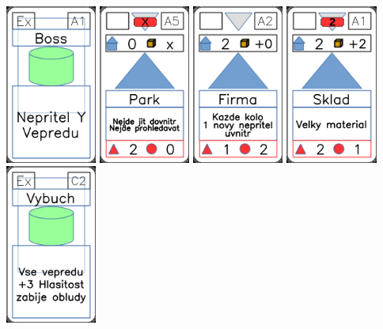 \documentclass[a4paper]{article}
\begin{document}
	\includegraphics[width=3.0cm]{img-4_0}
	\includegraphics[width=3.0cm]{img-3_19}
	\includegraphics[width=3.0cm]{img-3_16}
	\includegraphics[width=3.0cm]{img-3_15}
	\includegraphics[width=3.0cm]{img-4_11}
\end{document}
